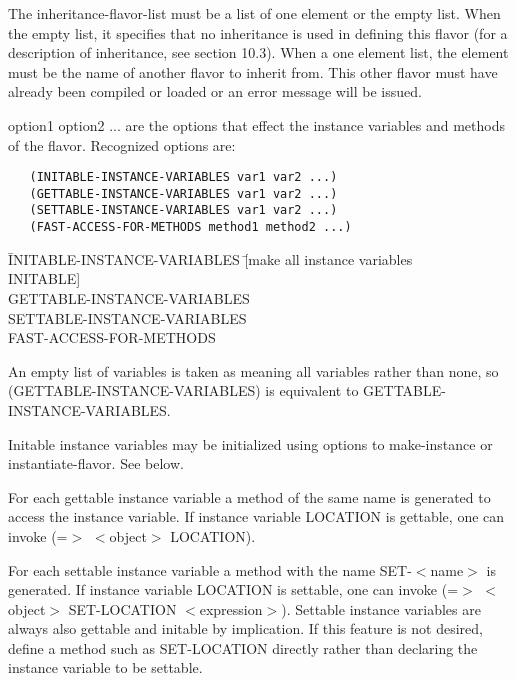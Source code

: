     The inheritance-flavor-list must be a list of one element or
    the empty list.  When the empty list, it specifies  that  no
    inheritance   is   used  in  defining  this  flavor  (for  a
    description of inheritance, see section 10.3).  When  a  one
    element list, the element must be the name of another flavor
    to  inherit  from.  This other flavor must have already been
    compiled or loaded or an error message will be issued.

    option1 option2 ... are the options that effect the instance
    variables and methods of  the  flavor.   Recognized  options
    are:

\begin{verbatim}
   (INITABLE-INSTANCE-VARIABLES var1 var2 ...)
   (GETTABLE-INSTANCE-VARIABLES var1 var2 ...)
   (SETTABLE-INSTANCE-VARIABLES var1 var2 ...)
   (FAST-ACCESS-FOR-METHODS method1 method2 ...)
\end{verbatim}
\begin{tabbing}
   \=INITABLE-INSTANCE-VARIABLES  \quad\=[make all instance
variables\\
																																\>\>INITABLE]\\
   \>GETTABLE-INSTANCE-VARIABLES  \\
   \>SETTABLE-INSTANCE-VARIABLES  \\
   \>FAST-ACCESS-FOR-METHODS      
\end{tabbing}
    An empty list of variables is taken as meaning all variables
    rather   than   none,  so  (GETTABLE-INSTANCE-VARIABLES)  is
    equivalent to GETTABLE-INSTANCE-VARIABLES.

    Initable instance variables may be initialized using options
    to make-instance or instantiate-flavor. See below.

    For each gettable instance variable a  method  of  the  same
    name  is  generated  to  access  the  instance variable.  If
    instance variable LOCATION is gettable, one can  invoke  (=$>$
    $<$object$>$ LOCATION).

    For  each  settable instance variable a method with the name
    SET-$<$name$>$ is generated. If instance variable LOCATION is
    settable,   one   can   invoke   (=$>$  $<$object$>$  SET-LOCATION
    $<$expression$>$).  Settable instance variables are always  also
    gettable  and  initable  by implication.  If this feature is
    not desired, define a method such as  SET-LOCATION  directly
    rather than declaring the instance variable to be settable.

